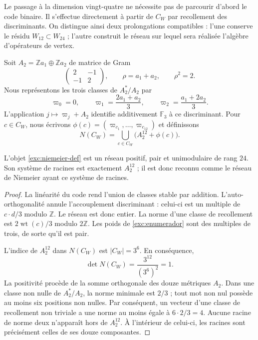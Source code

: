 Le passage à la dimension vingt-quatre ne nécessite pas de parcourir d'abord le
code binaire. Il s'effectue directement à partir de $C_W$ par recollement des
discriminants. On distingue ainsi deux prolongations compatibles :
l'une conserve le résidu $W_{12}\subset W_{24}$ ; l'autre construit le
réseau sur lequel sera réalisée l'algèbre d'opérateurs de vertex.

Soit $A_2=\mathbb Z a_1\oplus\mathbb Z a_2$ de matrice de Gram
\[
 \begin{pmatrix}2&-1\\-1&2\end{pmatrix},
 \qquad \rho=a_1+a_2,\qquad \rho^2=2.
\]
Nous représentons les trois classes de $A_2^*/A_2$ par
\[
 \varpi_0=0,\qquad
 \varpi_1=\frac{2a_1+a_2}{3},\qquad
 \varpi_2=\frac{a_1+2a_2}{3}.
\]
L'application $j\mapsto\varpi_j+A_2$ identifie additivement
$\mathbb F_3$ à ce discriminant. Pour $c\in C_W$, nous écrivons
$\phi(c)=(\varpi_{c_1},\ldots,\varpi_{c_{12}})$ et définissons
\begin{equation}
 N(C_W)=\bigcup_{c\in C_W}\bigl(A_2^{12}+\phi(c)\bigr).
 \label{exc:niemeier-def}
\end{equation}

\begin{theorem}
\label{exc:niemeier-teorema}
L'objet \eqref{exc:niemeier-def} est un réseau positif, pair et
unimodulaire de rang $24$. Son système de racines est exactement
$A_2^{12}$ ; il est donc reconnu comme le réseau de Niemeier ayant
ce système de racines.
\end{theorem}

\begin{proof}
La linéarité du code rend l'union de classes stable par addition. L'auto-orthogonalité annule l'accouplement discriminant : celui-ci est un multiple de $c\cdot d/3$ modulo $\mathbb Z$. Le réseau est donc entier. La norme d'une classe de recollement est $2\operatorname{wt}(c)/3$ modulo $2\mathbb Z$. Les poids de \eqref{exc:enumerador} sont des multiples de trois, de sorte qu'il est pair.

L'indice de $A_2^{12}$ dans $N(C_W)$ est $|C_W|=3^6$. En conséquence,
\[
 \det N(C_W)=\frac{3^{12}}{(3^6)^2}=1.
\]
La positivité procède de la somme orthogonale des douze métriques $A_2$.
Dans une classe non nulle de $A_2^*/A_2$, la norme minimale est $2/3$ ;
tout mot non nul possède au moins six positions non nulles.
Par conséquent, un vecteur d'une classe de recollement non triviale a une norme
au moins égale à $6\cdot2/3=4$. Aucune racine de norme deux n'apparaît hors de
$A_2^{12}$. À l'intérieur de celui-ci, les racines sont précisément celles de ses
douze composantes.
\end{proof}

